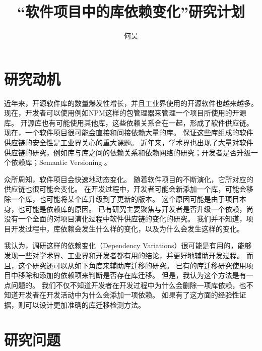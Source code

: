 \documentclass[UTF8]{ctexart}
\title{“软件项目中的库依赖变化”研究计划}
\author{何昊}
\begin{document}
\maketitle

\section{研究动机}

近年来，开源软件库的数量爆发性增长，并且工业界使用的开源软件也越来越多。
现在，开发者可以使用例如NPM这样的包管理器来管理一个项目所使用的开源库。
开源库也有可能使用其他库，这些依赖关系合在一起，形成了软件供应链。
现在，一个软件项目很可能会直接和间接依赖大量的库。
保证这些库组成的软件供应链的安全性是工业界关心的重大课题。
近年来，学术界也出现了大量对软件供应链的研究，例如库与库之间的依赖关系和依赖网络的研究\cite{2017MSR-Kikas-Structure, 2019MSR-Valero-DiversityMaven}；开发者是否升级一个依赖库\cite{2018EMSE-Kula-Do, 2018ICSME-Zapata-Towards}；Semantic Versioning \cite{2019MSR-Dietrich-DependencyVersioning, 2019TSE-Decan-Semantic}。

众所周知，软件项目会快速地动态变化。
随着软件项目的不断演化，它所对应的供应链也很可能会变化。
在开发过程中，开发者可能会新添加一个库，可能会移除一个库，也可能将某个库升级到了更新的版本。
这个原因可能是由于项目本身，也可能是依赖库的原因。
已有研究主要聚焦与开发者是否升级一个依赖，尚没有一个全面的对项目演化过程中软件供应链的变化的研究。
我们并不知道，项目开发过程中，库依赖会发生什么样的变化，以及为什么会发生这样的变化。

我认为，调研这样的依赖变化（Dependency Variations）很可能是有用的，能够发现一些对学术界、工业界和开发者都有用的结论，并更好地辅助开发过程。
而且，这个研究还可以从如下角度来辅助库迁移的研究。
已有的库迁移研究使用项目中移除和添加的依赖项来判断是否存在库迁移。
但是，我认为这个方法是有一点问题的。
我们不仅不知道开发者在开发过程中为什么会删除一项库依赖，也不知道开发者在开发活动中为什么会添加一项依赖。
如果有了这方面的经验性证据，则可以设计更加准确的库迁移检测方法。

\section{研究问题}
\end{document}
